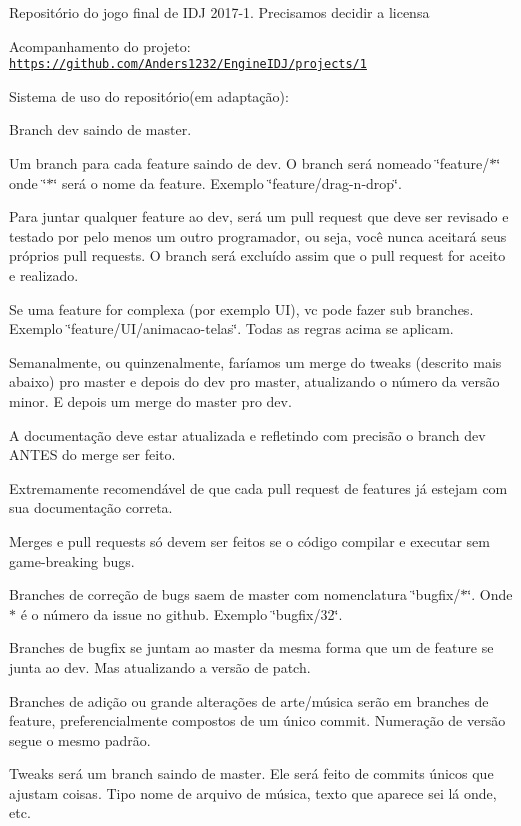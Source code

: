 Repositório do jogo final de I\+D\+J 2017-\/1. Precisamos decidir a licensa

Acompanhamento do projeto\+: \href{https://github.com/Anders1232/EngineIDJ/projects/1}{\tt https\+://github.\+com/\+Anders1232/\+Engine\+I\+D\+J/projects/1}

Sistema de uso do repositório(em adaptação)\+:
\begin{DoxyItemize}
\item Branch dev saindo de master.
\item Um branch para cada feature saindo de dev. O branch será nomeado \char`\"{}feature/$\ast$\char`\"{} onde \char`\"{}$\ast$\char`\"{} será o nome da feature. Exemplo \char`\"{}feature/drag-\/n-\/drop\char`\"{}.
\item Para juntar qualquer feature ao dev, será um pull request que deve ser revisado e testado por pelo menos um outro programador, ou seja, você nunca aceitará seus próprios pull requests. O branch será excluído assim que o pull request for aceito e realizado.
\item Se uma feature for complexa (por exemplo U\+I), vc pode fazer sub branches. Exemplo \char`\"{}feature/\+U\+I/animacao-\/telas\char`\"{}. Todas as regras acima se aplicam.
\item Semanalmente, ou quinzenalmente, faríamos um merge do tweaks (descrito mais abaixo) pro master e depois do dev pro master, atualizando o número da versão minor. E depois um merge do master pro dev.
\item A documentação deve estar atualizada e refletindo com precisão o branch dev A\+N\+T\+E\+S do merge ser feito.
\item Extremamente recomendável de que cada pull request de features já estejam com sua documentação correta.
\item Merges e pull requests só devem ser feitos se o código compilar e executar sem game-\/breaking bugs.
\item Branches de correção de bugs saem de master com nomenclatura \char`\"{}bugfix/$\ast$\char`\"{}. Onde $\ast$ é o número da issue no github. Exemplo \char`\"{}bugfix/32\char`\"{}.
\item Branches de bugfix se juntam ao master da mesma forma que um de feature se junta ao dev. Mas atualizando a versão de patch.
\item Branches de adição ou grande alterações de arte/música serão em branches de feature, preferencialmente compostos de um único commit. Numeração de versão segue o mesmo padrão.
\item Tweaks será um branch saindo de master. Ele será feito de commits únicos que ajustam coisas. Tipo nome de arquivo de música, texto que aparece sei lá onde, etc.

\end{DoxyItemize}
